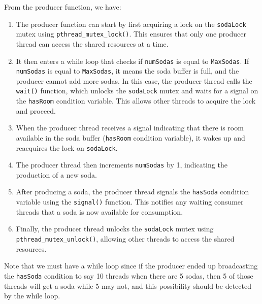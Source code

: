 \documentclass{article}
\begin{document}
\begin{example}
      From the producer function, we have: 

      \begin{enumerate}
        \item The producer function can start by first acquiring a lock on the \texttt{sodaLock} mutex using \texttt{pthread\_mutex\_lock()}. This ensures that only one producer thread can access the shared resources at a time.

        \item It then enters a while loop that checks if \texttt{numSodas} is equal to \texttt{MaxSodas}. If \texttt{numSodas} is equal to \texttt{MaxSodas}, it means the soda buffer is full, and the producer cannot add more sodas. In this case, the producer thread calls the \texttt{wait()} function, which unlocks the \texttt{sodaLock} mutex and waits for a signal on the \texttt{hasRoom} condition variable. This allows other threads to acquire the lock and proceed.

        \item When the producer thread receives a signal indicating that there is room available in the soda buffer (\texttt{hasRoom} condition variable), it wakes up and reacquires the lock on \texttt{sodaLock}.

        \item The producer thread then increments \texttt{numSodas} by 1, indicating the production of a new soda.

        \item After producing a soda, the producer thread signals the \texttt{hasSoda} condition variable using the \texttt{signal()} function. This notifies any waiting consumer threads that a soda is now available for consumption.

        \item Finally, the producer thread unlocks the \texttt{sodaLock} mutex using \texttt{pthread\_mutex\_unlock()}, allowing other threads to access the shared resources.

      \end{enumerate}
      Note that we must have a while loop since if the producer ended up broadcasting the \texttt{hasSoda} condition to say 10 threads when there are 5 sodas, then 5 of those threads will get a soda while 5 may not, and this possibility should be detected by the while loop. 
    \end{example}
\end{document}
